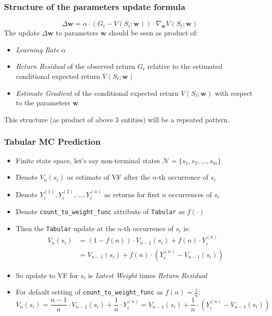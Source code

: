 \documentclass[handout]{beamer}
\begin{document}
\begin{frame}
\frametitle{Structure of the parameters update formula}
\pause
$$\Delta \bm{w} = \alpha \cdot (G_t - V(S_t;\bm{w})) \cdot \nabla_{\bm{w}} V(S_t;\bm{w})$$
\vspace{3mm}
\pause
The update $\Delta \bm{w}$ to parameters $\bm{w}$ should be seen as product of:
\pause
\begin{itemize}[<+->]
\item {\em Learning Rate} $\alpha$
\item {\em Return Residual} of the observed return $G_t$ relative to the estimated conditional expected return $V(S_t;\bm{w})$
\item {\em Estimate Gradient} of the conditional expected return $V(S_t;\bm{w})$ with respect to the parameters $\bm{w}$
\end{itemize}
\pause
\vspace{3mm}
This structure (as product of above 3 entities) will be a repeated pattern.
\end{frame}


\begin{frame}
\frametitle{Tabular MC Prediction}
\pause
\begin{itemize}[<+->]
\item Finite state space, let's say non-terminal states $\mathcal{N} = \{s_1, s_2, \ldots, s_m\}$
\item Denote $V_n(s_i)$ as estimate of VF after the $n$-th occurrence of $s_i$
\item Denote $Y^{(1)}_i, Y^{(2)}_i, \ldots, Y^{(n)}_i$ as returns for first $n$ occurrences of $s_i$
\item Denote \lstinline{count_to_weight_func} attribute of \lstinline{Tabular} as $f(\cdot)$
\item Then the \lstinline{Tabular} update at the $n$-th occurrence of $s_i$ is:
\begin{align*}
V_n(s_i) & = (1 - f(n)) \cdot V_{n-1}(s_i) + f(n) \cdot Y^{(n)}_i \\
& = V_{n-1}(s_i) + f(n) \cdot (Y^{(n)}_i - V_{n-1}(s_i))
\end{align*}
\item So update to VF for $s_i$ is {\em Latest Weight} times {\em Return Residual}
\item For default setting of \lstinline{count_to_weight_func} as $f(n) = \frac 1 n$:
$$V_n(s_i) = \frac {n-1} n \cdot V_{n-1}(s_i) + \frac 1 n \cdot Y^{(n)}_i = V_{n-1}(s_i) + \frac 1 n \cdot (Y^{(n)}_i - V_{n-1}(s_i))$$
\end{itemize}
\end{frame}
\end{document}

